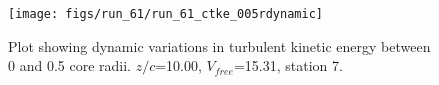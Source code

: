 \begin{figure}[H]
\centering
\texttt{[image: figs/run\_61/run\_61\_ctke\_005rdynamic]}
\caption{Plot showing dynamic variations in turbulent kinetic energy between 0 and 0.5 core radii. $z/c$=10.00, $V_{free}$=15.31, station 7.}
\label{fig:run_61_ctke_005rdynamic}
\end{figure}


